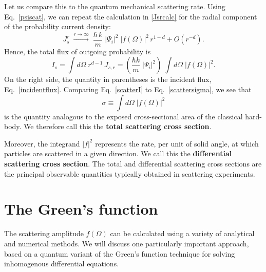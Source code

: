 \documentclass[prx,12pt]{revtex4-2}
\begin{document}
Let us compare this to the quantum mechanical scattering rate.  Using
Eq.~\eqref{psiscat}, we can repeat the calculation in \eqref{Jsrcalc}
for the radial component of the probability current density:
\begin{equation}
  J_s^r \; \overset{r\rightarrow\infty}{\longrightarrow}\;
  \frac{\hbar \,k}{m}\; |\Psi_i|^2 \; |f(\Omega)|^2 \,r^{1-d}
  + O(r^{-d}).
\end{equation}
Hence, the total flux of outgoing probability is
\begin{equation}
  I_s = \int d\Omega\; r^{d-1} \, J_{s,r}
  = \left(\frac{\hbar k}{m} \;|\Psi_i|^2\right) \; \int d\Omega\; \big|f(\Omega)\big|^2.
  \label{scatterI}
\end{equation}
On the right side, the quantity in parentheses is the incident flux,
Eq.~\eqref{incidentflux}.  Comparing Eq.~\eqref{scatterI} to
Eq.~\eqref{scattersigma}, we see that
\begin{equation*}
  \sigma \equiv \int d\Omega \; \big|f(\Omega)\big|^2
\end{equation*}
is the quantity analogous to the exposed cross-sectional area of the
classical hard-body.  We therefore call this the \textbf{total
  scattering cross section}.

Moreover, the integrand $|f|^2$ represents the rate, per unit of solid
angle, at which particles are scattered in a given direction.  We call
this the \textbf{differential scattering cross section}.  The total
and differential scattering cross sections are the principal
observable quantities typically obtained in scattering experiments.

\section{The Green's function}
\label{sec:greensfun}

The scattering amplitude $f(\Omega)$ can be calculated using a variety
of analytical and numerical methods.  We will discuss one particularly
important approach, based on a quantum variant of the Green's function
technique for solving inhomogenous differential equations.
\end{document}

